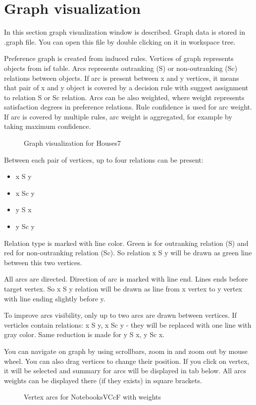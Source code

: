 \section{Graph visualization}\label{section:graph}

In this section graph visualization window is described. Graph data is stored in .graph file. You can open this file by double clicking on it in workspace tree.

Preference graph is created from induced rules. Vertices of graph represents objects from isf table. Arcs represents outranking (S) or non-outranking (Sc) relations between objects. If arc is present between x and y vertices, it means that pair of x and y object is covered by a decision rule with suggest assignment to relation S or Sc relation. Arcs can be also weighted, where weight represents satisfaction degrees in preference relations. Rule confidence is used for arc weight. If arc is covered by multiple rules, arc weight is aggregated, for example by taking maximum confidence.

\begin{figure*}[!ht] 
	\centering
	\caption{Graph visualization for Houses7}
\end{figure*}

Between each pair of vertices, up to four relations can be present:
\begin{itemize}
	\item x S y
	\item x Sc y
	\item y S x
	\item y Sc y
\end{itemize}

Relation type is marked with line color. Green is for outranking relation (S) and red for non-outranking relation (Sc). So relation x S y will be drawn as green line between this two vertices.

All arcs are directed. Direction of arc is marked with line end. Lines ends before target vertex. So x S y relation will be drawn as line from x vertex to y vertex with line ending slightly before y.

To improve arcs visibility, only up to two arcs are drawn between vertices. If verticles contain relations: x S y, x Sc y - they will be replaced with one line with gray color. Same reduction is made for y S x, y Sc x.

You can navigate on graph by using scrollbars, zoom in and zoom out by mouse wheel. You can also drag vertices to change their position. If you click on vertex, it will be selected and summary for arcs will be displayed in tab below. All arcs weights can be displayed there (if they exists) in square brackets.

\begin{figure*}[!ht] 
	\centering
	\caption{Vertex arcs for NotebooksVCcF with weights}
\end{figure*}


\vfill\newpage